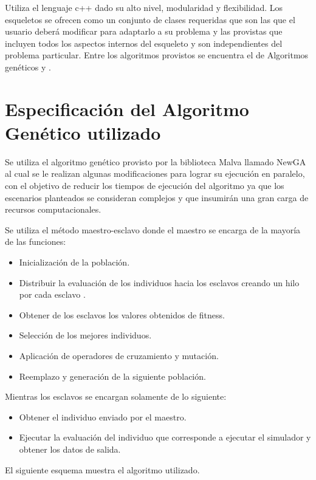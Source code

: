 Utiliza el lenguaje c++ dado su alto nivel, modularidad y flexibilidad. Los esqueletos se ofrecen como un conjunto de clases requeridas que son las que el usuario deberá modificar para adaptarlo a su problema y las provistas que incluyen todos los aspectos internos del esqueleto y son independientes del problema particular. Entre los algoritmos provistos se encuentra el de Algoritmos genéticos y \citet{CHC}.





\section{Especificación del Algoritmo Genético utilizado}
Se utiliza el algoritmo genético provisto por la biblioteca  Malva  llamado NewGA al cual se le realizan algunas modificaciones para lograr su ejecución en paralelo, con el objetivo de reducir los tiempos de ejecución del algoritmo ya que los escenarios planteados se consideran complejos y que insumirán una gran carga de recursos computacionales.

Se utiliza el método maestro-esclavo donde el maestro se encarga de la mayoría de las funciones:

\begin{itemize}
\item Inicialización de la población.
\item Distribuir la evaluación de los individuos hacia los esclavos creando un hilo por cada esclavo	.
\item Obtener de los esclavos los valores obtenidos de fitness.
\item Selección de los mejores individuos.
\item Aplicación de operadores de cruzamiento y mutación.
\item Reemplazo y generación de la siguiente población.
\end{itemize}

Mientras los esclavos se encargan solamente de lo siguiente:
\begin{itemize}
	\item Obtener el individuo enviado por el maestro.
	\item Ejecutar la evaluación del individuo que corresponde a ejecutar el simulador y obtener los datos de salida.
\end{itemize}


El siguiente esquema muestra el algoritmo utilizado. 

